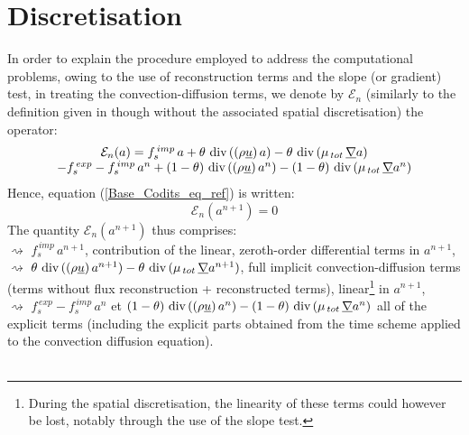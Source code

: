 \section*{Discretisation}
In order to explain the procedure employed to address the computational
problems, owing to the use of reconstruction terms and the slope (or gradient)
test, in treating the convection-diffusion terms, we denote by $\mathcal{E}_{n}$
(similarly to the definition given in  though without the associated spatial discretisation)
the operator:
\begin{equation}\label{Base_Codits_Eq_ref_small}
\begin{array}{c}
\mathcal{E}_{n}(a) = f_s^{\,imp}\,a + \theta\,\, \text{div}\,((\rho
\underline{u})\,a) - \theta\,\, \text{div}\,(\mu_{\,tot}\,\underline{\nabla} a)\\
- f_s^{\,exp} -  f_s^{\,imp}\,a^{n} +(1-\theta)\,\,\text{div}\,((\rho
\underline{u})\, a^n) - (1-\theta)\,\, \text{div}\,(\mu_{\,tot}\,\underline{\nabla} a^n)
\end{array}
\end{equation}
Hence, equation (\ref{Base_Codits_eq_ref}) is written:
\begin{equation}
\mathcal{E}_{n}(a^{n+1}) = 0
\end{equation}
The quantity  $\mathcal{E}_{n}(a^{n+1})$ thus comprises:\\
\hspace*{1.cm} $\rightsquigarrow$ $f_s^{\,imp}\,a^{n+1}$, contribution of the linear, zeroth-order
differential terms in $a^{n+1}$,\\
\hspace*{1.cm} $\rightsquigarrow$ $\theta\,\,
\text{div}\,((\rho\underline{u})\,a^{n+1})
- \theta\,\, \text{div}\,(\mu_{\,tot}\,\underline{\nabla} a^{n+1})$, full implicit convection-diffusion terms
(terms without flux reconstruction + reconstructed terms),
linear\footnote{During the spatial discretisation, the linearity of these terms
could however be lost, notably through the use of the slope test.}
in $a^{n+1}$,\\
\hspace*{1.cm} $\rightsquigarrow$ $f_s^{\,exp}- f_s^{\,imp}\,a^n$ et
$(1-\theta)\,\,\text{div}\,((\rho
\underline{u})\,a^n) - (1-\theta)\,\, \text{div}\,(\mu_{\,tot}\,\underline{\nabla} a^n)$ all of the
explicit terms (including the explicit parts obtained from the time scheme
applied to the convection diffusion equation).\\\\

